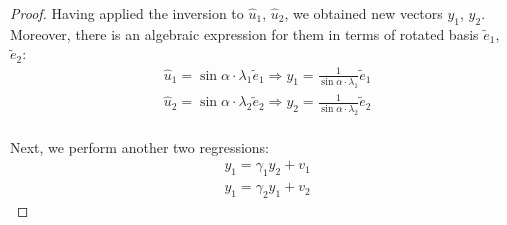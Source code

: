 \begin{proof}

Having applied the inversion to $\hat{u}_1$, $\hat{u}_2$, we obtained
new vectors $y_1$, $y_2$. Moreover, there is an algebraic expression for them
in terms of rotated basis $\tilde{e}_1$, $\tilde{e}_2$:
\begin{align*}
&\hat{u}_1 = \sin \alpha \cdot \lambda_1 \tilde{e}_1 \Rightarrow y_1 = \frac{1}{\sin \alpha \cdot \lambda_1} \tilde{e}_1 \\
&\hat{u}_2 = \sin \alpha \cdot \lambda_2 \tilde{e}_2 \Rightarrow y_2 = \frac{1}{\sin \alpha \cdot \lambda_2} \tilde{e}_2 \\
\end{align*}

Next, we perform another two regressions:
\begin{align*}
& y_1 = \gamma_1 y_2 + v_1 \\
& y_1 = \gamma_2 y_1 + v_2
\end{align*}


\end{proof}
